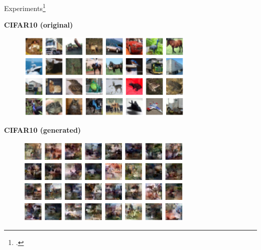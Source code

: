 \documentclass[aspectratio=169, 9pt]{beamer}
\theoremstyle{definition}
\begin{document}
\begin{frame}{Experiments\footcite{thermodynamic}}
  \begin{minipage}[h!]{0.5\textwidth}
    \begin{center}
      \bf CIFAR10 (original)
    \end{center}
    \begin{figure}[h!]
      \centering
      \includegraphics[width=0.75\textwidth]{./pic/cifar10_thermo_original.png}
    \end{figure}
  \end{minipage}\hfill%
  \begin{minipage}[h!]{0.5\textwidth}
    \begin{center}
      \bf CIFAR10 (generated)
    \end{center}
    \begin{figure}[h!]
      \centering
      \includegraphics[width=0.75\textwidth]{./pic/cifar10_thermo_generated.png}
    \end{figure}
  \end{minipage}
\end{frame}
\end{document}

